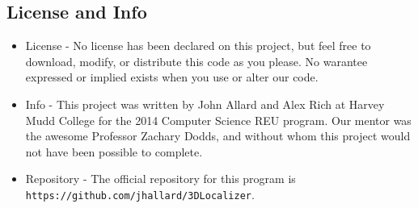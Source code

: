\documentclass[a4paper,11pt]{article}
\begin{document}
       \subsection{License and Info}
       \begin{itemize}
        \item License - No license has been declared on this project, but feel free to download, modify, or distribute this code as you please.
        No warantee expressed or implied exists when you use or alter our code.
        \item Info    - This project was written by John Allard and Alex Rich at Harvey Mudd College for the 2014 Computer Science REU program.
        Our mentor was the awesome Professor Zachary Dodds, and without whom this project would not have been possible to complete.
        \item Repository - The official repository for this program is \texttt{https://github.com/jhallard/3DLocalizer}. 
       \end{itemize}

\end{document}
